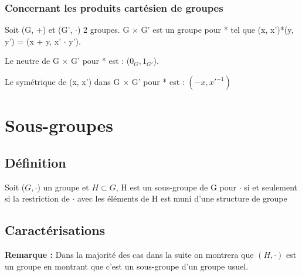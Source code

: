 \documentclass[12pt,a4paper,french]{book}
\begin{document}
\begin{spacing}{1.0}
			\subsubsection{Concernant les produits cartésien de groupes}
			Soit (G, +) et (G', \(\cdot\)) 2 groupes.
			G \(\times\) G' est un groupe pour * tel que (x, x')*(y, y') = (x + y, x' \(\cdot\) y').
			
			Le neutre de G \(\times\) G' pour * est : (\(0_G, 1_{G'}\)).
			
			Le symétrique de (x, x') dans G \(\times\) G' pour * est : \((-x, x'^{-1})\)
	\section{Sous-groupes}
		\subsection{Définition}
		Soit (\(G, \cdot\)) un groupe et \(H \subset G\), H est un sous-groupe de G pour \(\cdot\) si et seulement si la restriction de \(\cdot\) avec les éléments de H est muni d'une structure de groupe
		\subsection{Caractérisations}
		\begin{center}
		\end{center}
		
		\textbf{Remarque : } Dans la majorité des cas dans la suite on montrera que \((H, \cdot)\) est un groupe en montrant que c'est un sous-groupe d'un groupe usuel.

\end{spacing}
\end{document}
